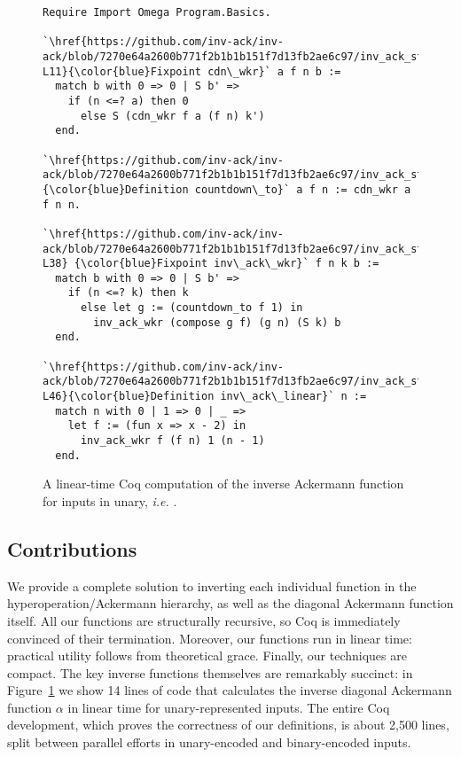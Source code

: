 \begin{figure}
\lstset{style=myTinyStyle}
\begin{lstlisting}
Require Import Omega Program.Basics.

`\href{https://github.com/inv-ack/inv-ack/blob/7270e64a2600b771f2b1b1b151f7d13fb2ae6c97/inv_ack_standalone.v#L6-L11}{\color{blue}Fixpoint cdn\_wkr}` a f n b :=
  match b with 0 => 0 | S b' =>
    if (n <=? a) then 0
      else S (cdn_wkr f a (f n) k')
  end.

`\href{https://github.com/inv-ack/inv-ack/blob/7270e64a2600b771f2b1b1b151f7d13fb2ae6c97/inv_ack_standalone.v#L14}{\color{blue}Definition countdown\_to}` a f n := cdn_wkr a f n n.

`\href{https://github.com/inv-ack/inv-ack/blob/7270e64a2600b771f2b1b1b151f7d13fb2ae6c97/inv_ack_standalone.v#L32-L38} {\color{blue}Fixpoint inv\_ack\_wkr}` f n k b :=
  match b with 0 => 0 | S b' =>
    if (n <=? k) then k
      else let g := (countdown_to f 1) in
        inv_ack_wkr (compose g f) (g n) (S k) b
  end.

`\href{https://github.com/inv-ack/inv-ack/blob/7270e64a2600b771f2b1b1b151f7d13fb2ae6c97/inv_ack_standalone.v#L42-L46}{\color{blue}Definition inv\_ack\_linear}` n :=
  match n with 0 | 1 => 0 | _ => 
    let f := (fun x => x - 2) in
      inv_ack_wkr f (f n) 1 (n - 1)
  end.
\end{lstlisting}
\caption{A linear-time Coq computation of the inverse Ackermann function for inputs in unary, \emph{i.e.} .}
\label{fig:standalone}
\end{figure}

\subsection{Contributions}
We provide a complete solution to inverting each individual function in the hyperoperation/Ackermann hierarchy,
as well as the diagonal Ackermann function itself.  All our functions are structurally recursive, so
Coq is immediately convinced of their termination.  Moreover, our functions run in linear time: practical utility follows from theoretical grace.
Finally, our techniques are compact.  The key inverse functions themselves are remarkably succinct: in Figure~\ref{fig:standalone} we show 14 lines of code that calculates the inverse diagonal Ackermann function $\alpha$ in linear time for unary-represented inputs. The entire Coq development, which proves the correctness of our definitions, is about 2,500 lines, split between parallel efforts in unary-encoded and binary-encoded inputs.

